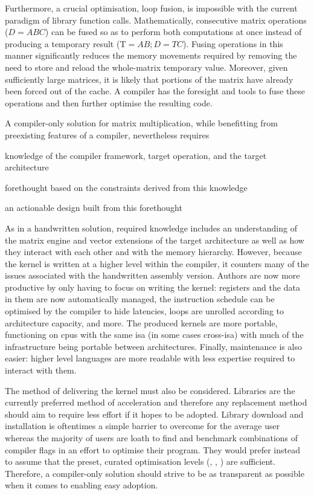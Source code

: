 \documentclass[\main/thesis.tex]{subfiles}
\begin{document}
Furthermore, a crucial optimisation, loop fusion, is impossible with the current paradigm of library function calls.
Mathematically, consecutive matrix operations (\eg $D = ABC$) can be fused so as to perform both computations at once instead of producing a temporary result (\ie $\text{T}=AB;D=TC$).
Fusing operations in this manner significantly reduces the memory movements required by removing the need to store and reload the whole-matrix temporary value.
Moreover, given sufficiently large matrices, it is likely that portions of the matrix have already been forced out of the cache.
A compiler has the foresight and tools to fuse these operations and then further optimise the resulting code.

A compiler-only solution for matrix multiplication, while benefitting from preexisting features of a compiler, nevertheless requires
\begin{enumerate*}[itemjoin={{; }}, itemjoin*={{; and }}, label={}, afterlabel={}, after={.}]
  \item knowledge of the compiler framework, target operation, and the target architecture
  \item forethought based on the constraints derived from this knowledge
  \item an actionable design built from this forethought
\end{enumerate*}
As in a handwritten solution, required knowledge includes an understanding of the matrix engine and vector extensions of the target architecture as well as how they interact with each other and with the memory hierarchy.
However, because the kernel is written at a higher level within the compiler, it counters many of the issues associated with the handwritten assembly version.
Authors are now more productive by only having to focus on writing the kernel: registers and the data in them are now automatically managed, the instruction schedule can be optimised by the compiler to hide latencies, loops are unrolled according to architecture capacity, and more.
The produced kernels are more portable, functioning on \glspl{cpu} with the same \gls{isa} (in some cases cross-\gls{isa}) with much of the infrastructure being portable between architectures.
Finally, maintenance is also easier: higher level languages are more readable with less expertise required to interact with them.

The method of delivering the kernel must also be considered.
Libraries are the currently preferred method of acceleration and therefore any replacement method should aim to require less effort if it hopes to be adopted.
Library download and installation is oftentimes a simple barrier to overcome for the average user whereas the majority of users are loath to find and benchmark combinations of compiler flags in an effort to optimise their program.
They would prefer instead to assume that the preset, curated optimisation levels (\ie {}, , ) are sufficient.
Therefore, a compiler-only solution should strive to be as transparent as possible when it comes to enabling easy adoption.
\end{document}
